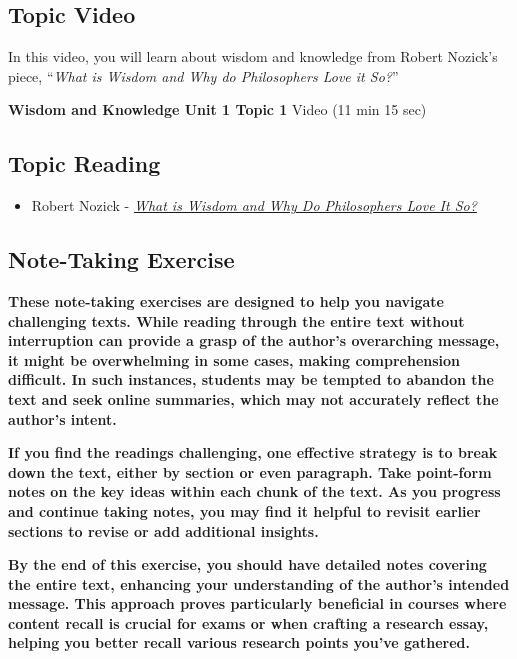 \documentclass[
]{book}
\providecommand{\tightlist}{%
  \setlength{\itemsep}{0pt}\setlength{\parskip}{0pt}}
\begin{document}
\hypertarget{topic-video}{%
\subsection*{Topic Video}\label{topic-video}}

In this video, you will learn about wisdom and knowledge from Robert Nozick's piece, ``\emph{What is Wisdom and Why do Philosophers Love it So?}''

\textbf{Wisdom and Knowledge Unit 1 Topic 1} Video (11 min 15 sec)

\hypertarget{topic-reading}{%
\subsection*{Topic Reading}\label{topic-reading}}

\begin{itemize}
\tightlist
\item
  Robert Nozick - \href{assets/u1/PHIL-100-Nozick-What-is-Wisdom.pdf}{\emph{What is Wisdom and Why Do Philosophers Love It So?}}
\end{itemize}

\hypertarget{note-taking-exercise}{%
\subsection*{Note-Taking Exercise}\label{note-taking-exercise}}

\textbf{These note-taking exercises are designed to help you navigate challenging texts. While reading through the entire text without interruption can provide a grasp of the author's overarching message, it might be overwhelming in some cases, making comprehension difficult. In such instances, students may be tempted to abandon the text and seek online summaries, which may not accurately reflect the author's intent.}

\textbf{If you find the readings challenging, one effective strategy is to break down the text, either by section or even paragraph. Take point-form notes on the key ideas within each chunk of the text. As you progress and continue taking notes, you may find it helpful to revisit earlier sections to revise or add additional insights.}

\textbf{By the end of this exercise, you should have detailed notes covering the entire text, enhancing your understanding of the author's intended message. This approach proves particularly beneficial in courses where content recall is crucial for exams or when crafting a research essay, helping you better recall various research points you've gathered.}
\end{document}
